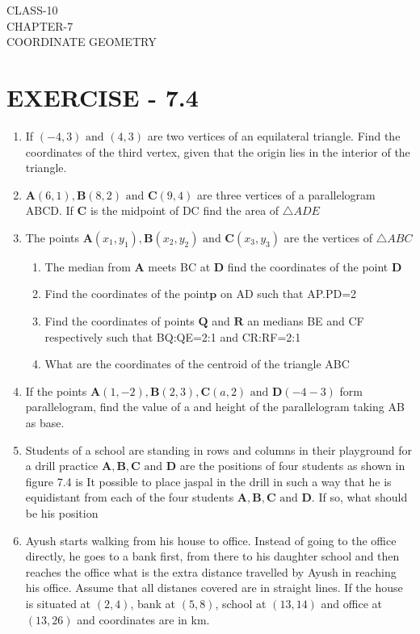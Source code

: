 \documentclass[12pt]{article}
\let\vec\mathbf
\begin{document}
\begin{center}
\textbf\large{CLASS-10\\CHAPTER-7 \\ COORDINATE GEOMETRY}
\end{center}

\section*{EXERCISE - 7.4}

\begin{enumerate}
\item If $(-4,3)\text{ and }(4,3)$ are two vertices of an equilateral triangle. Find the coordinates of the third vertex, given that the origin lies in the interior of the triangle. 
\item $\vec{A} (6,1),\vec{B}(8,2) \text{ and } \vec{C}(9,4)$ are three vertices of a parallelogram ABCD. If $\vec{C}$ is the midpoint of DC find the area of $\triangle ADE$
\item The points $\vec{A} (x_1,y_1),\vec{B}(x_2,y_2)\text{ and } \vec{C} (x_3,y_3) $ are the vertices of $\triangle ABC$
	\begin{enumerate}	
		\item The median from $\vec{A}$ meets BC at $\vec{D}$ find the coordinates of the point $\vec{D}$
		\item Find the coordinates of the point$\vec{p}$ on AD such that AP.PD=2
\item Find the coordinates of points $\vec{Q}$ and $\vec{R}$ an medians BE and CF respectively such that BQ:QE=2:1 and CR:RF=2:1
\item What are the coordinates of the centroid of the triangle ABC
	\end{enumerate}
\item If the points  $\vec{A}(1,-2), \vec{B}(2,3) , \vec{C}(a,2)\text{ and }\vec{D} (-4-3)$ form parallelogram, find the value of a and height of the parallelogram taking AB as base.
\item Students of a school are standing in rows and columns in their playground for a drill practice $\vec{A},\vec{B},\vec{C} \text{ and } \vec{D}$ are the positions of four students as shown in figure 7.4 is It possible to place jaspal in the drill in such a way that he is equidistant from each of the four students $\vec{A},\vec{B},\vec{C} \text{ and } \vec{D}$. If so, what should be his position 
\item Ayush starts walking from his house to office. Instead of going to the office directly, he goes to a bank first, from there to his daughter school and then reaches the office what is the extra distance travelled by Ayush in reaching his office. Assume that all distanes covered are in straight lines. If the house is situated at $(2,4)$, bank at $(5,8)$, school at $(13,14)$ and office at $(13,26)$ and coordinates are in km.


\end{enumerate}
\end{document}
